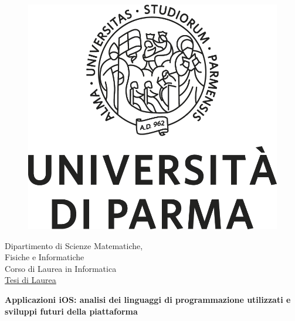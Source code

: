 \begin{titlepage}
  \hypersetup{pageanchor=false}

  \begin{center}
    \begin{figure}
      \centering
      \includegraphics[scale=0.20]{logouni.png}
            \vspace{0.8cm}
    \end{figure}


    \begin{Large}
      Dipartimento di Scienze Matematiche,\\Fisiche e Informatiche\\
      \medskip
      Corso di Laurea in Informatica \\
      \medskip
      \underline{Tesi di Laurea} \\
      \vspace{0.8cm}
      
      \begin{huge}
        \textbf{Applicazioni iOS: analisi dei linguaggi di programmazione utilizzati e sviluppi futuri della piattaforma} \\
      \end{huge}
      

\end{Large}
\end{center}
\end{titlepage}
